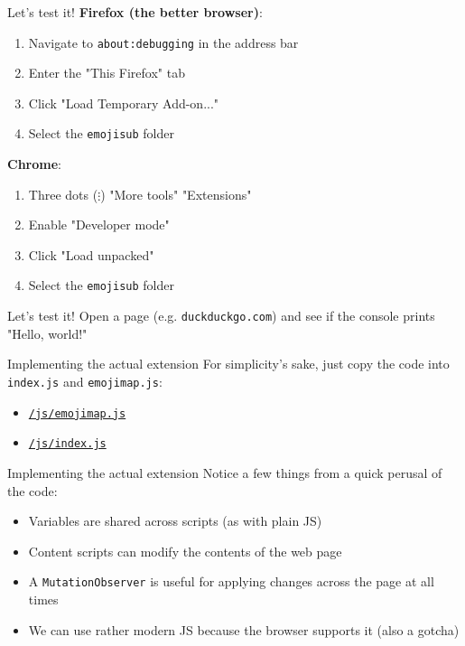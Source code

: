 \documentclass[../index.tex]{subfiles}
\begin{document}
\renewcommand{\currenttitle}{Let's test it!}
\begin{frame}[fragile]{\currenttitle}
  \textbf{Firefox (the better browser)}:
  \begin{enumerate}
    \item Navigate to \texttt{about:debugging} in the address bar
    \item Enter the "This Firefox" tab
    \item Click "Load Temporary Add-on..."
    \item Select the \texttt{emojisub} folder
  \end{enumerate}

  \textbf{Chrome}:
  \begin{enumerate}
    \item Three dots ($\vdots$) \textrightarrow "More tools" \textrightarrow
          "Extensions"
    \item Enable "Developer mode"
    \item Click "Load unpacked"
    \item Select the \texttt{emojisub} folder
  \end{enumerate}
\end{frame}

\begin{frame}[fragile]{\currenttitle}
  Open a page (e.g. \texttt{duckduckgo.com}) and see if the console prints
  "Hello, world!"
\end{frame}

\renewcommand{\currenttitle}{Implementing the actual extension}
\begin{frame}[fragile]{\currenttitle}
  For simplicity's sake, just copy the code into \texttt{index.js} and
  \texttt{emojimap.js}:

  \begin{itemize}
    \item \href{https://github.com/Dophin2009/webext101/blob/master/emojisub/js/emojimap.js}{\texttt{/js/emojimap.js}}
    \item \href{https://github.com/Dophin2009/webext101/blob/master/emojisub/js/index.js}{\texttt{/js/index.js}}
  \end{itemize}
\end{frame}

\begin{frame}[fragile]{\currenttitle}
  Notice a few things from a quick perusal of the code:

  \begin{itemize}
    \item Variables are shared across scripts (as with plain JS)
    \item Content scripts can modify the contents of the web page
    \item A \texttt{MutationObserver} is useful for applying changes across the
          page at all times
    \item We can use rather modern JS because the browser supports it (also a
          gotcha)
  \end{itemize}
\end{frame}
\end{document}
